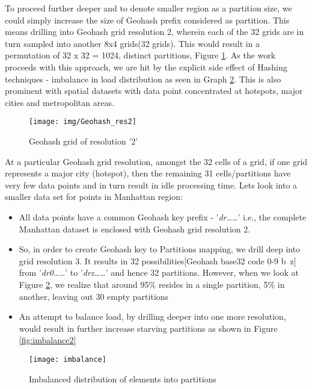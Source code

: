 \documentclass[article,type=msc,colorback,10pt,accentcolor=tud1d]{tudthesis}
\begin{document}
		To proceed further deeper and to denote smaller region as a partition size, we could simply increase the size of Geohash prefix considered as partition. This means drilling into Geohash grid resolution 2, wherein each of the 32 grids are in turn  sampled into another 8x4 grids(32 grids). This would result in a permutation of 32 x 32 = 1024, distinct partitions, Figure \ref{fig:Geohash_res2}. As the work proceeds with this approach, we are hit by the explicit side effect of Hashing techniques - imbalance in load distribution as seen in Graph \ref{fig:imbalance}. This is also prominent with spatial datasets with data point concentrated at hotspots, major cities and metropolitan areas. 
		
			\begin{figure}[h]
				\centering
				\texttt{[image: img/Geohash\_res2]}
				\caption{Geohash grid of resolution '2'}
				\label{fig:Geohash_res2}
			\end{figure}
		
		
		At a particular Geohash grid resolution, amongst the 32 cells of a grid, if one grid represents a major city (hotspot), then the remaining 31 cells/partitions have very few data points and in turn result in idle processing time. Lets look into a smaller data set for points in Manhattan region:
		
		\begin{itemize}
			\item All data points have a common Geohash key prefix - '\textit{dr\dots\dots}' i.e., the complete Manhattan dataset is enclosed with Geohash grid resolution 2.
			
			\item So, in order to create Geohash key to Partitions mapping, we drill deep into grid resolution 3. It results in 32 possibilities[Geohash base32 code 0-9 b~z] from '\textit{dr0\dots\dots}' to '\textit{drz\dots\dots}' and hence 32 partitions. However, when we look at Figure \ref{fig:imbalance}, we realize that around 95\% resides in a single partition, 5\% in another, leaving out 30 empty partitions
				
			\item An attempt to balance load, by drilling deeper into one more resolution, would result in further increase starving partitions as shown in Figure \ref{fig:imbalance2}
		\end{itemize}
							
				\begin{figure}[hp]
					\centering
					\texttt{[image: imbalance]}
					\caption{Imbalanced distribution of elements into partitions}
					\label{fig:imbalance}
				\end{figure}		
				
\end{document}
